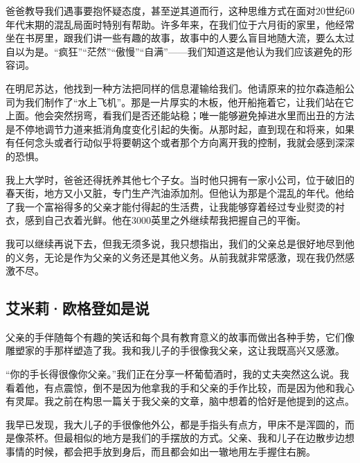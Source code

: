 爸爸教导我们遇事要抱怀疑态度，甚至逆其道而行，这种思维方式在面对20世纪60年代末期的混乱局面时特别有帮助。许多年来，在我们位于六月街的家里，他经常坐在书房里，跟我们讲一些有趣的故事，故事中的人要么盲目地随大流，要么太过自以为是。“疯狂”“茫然”“傲慢”“自满”——我们知道这是他认为我们应该避免的形容词。
\par

在明尼苏达，他找到一种方法把同样的信息灌输给我们。他请原来的拉尔森造船公司为我们制作了“水上飞机”。那是一片厚实的木板，他开船拖着它，让我们站在它上面。他会突然拐弯，看我们是否还能站稳；唯一能够避免掉进水里而出丑的方法是不停地调节力道来抵消角度变化引起的失衡。从那时起，直到现在和将来，如果有任何念头或者行动似乎将要朝这个或者那个方向离开我的控制，我就会感到深深的恐惧。
\par

我上大学时，爸爸还得抚养其他七个子女。当时他只拥有一家小公司，位于破旧的春天街，地方又小又脏，专门生产汽油添加剂。但他认为那是个混乱的年代。他给了我一个富裕得多的父亲才能付得起的生活费，让我能够穿着经过专业熨烫的衬衣，感到自己衣着光鲜。他在3000英里之外继续帮我把握自己的平衡。
\par

我可以继续再说下去，但我无须多说，我只想指出，我们的父亲总是很好地尽到他的义务，无论是作为父亲的义务还是其他义务。从前我就非常感激，现在我仍然感激不尽。
\par

\subsection*{艾米莉·欧格登如是说}

\begin{WisdomBox}
\par

父亲的手伴随每个有趣的笑话和每个具有教育意义的故事而做出各种手势，它们像雕塑家的手那样塑造了我。我和我儿子的手很像我父亲，这让我既高兴又感激。
\par
\end{WisdomBox}

“你的手长得很像你父亲。”我们正在分享一杯葡萄酒时，我的丈夫突然这么说。我看着他，有点震惊，倒不是因为他拿我的手和父亲的手作比较，而是因为他和我心有灵犀。我之前在构思一篇关于我父亲的文章，脑中想着的恰好是他提到的这点。
\par

我早已发现，我大儿子的手很像他外公，都是手指头有点方，甲床不是浑圆的，而是像茶杯。但最相似的地方是我们的手摆放的方式。父亲、我和儿子在边散步边想事情的时候，都会把手放到身后，而且都会如出一辙地用左手握住右腕。
\par

